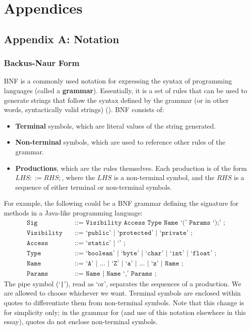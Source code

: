 \section{Appendices}

\subsection{Appendix A: Notation}
\label{sec:AppA}

\subsubsection*{Backus-Naur Form}
BNF is a commonly used notation for expressing the syntax of programming languages (called a \textbf{grammar}). Essentially, it is a set of rules that can be used to generate strings that follow the syntax defined by the grammar (or in other words, syntactically valid strings) (\cite{nystrom}). BNF consists of:
\begin{itemize}
\item \textbf{Terminal} symbols, which are literal values of the string generated.
\item \textbf{Non-terminal} symbols, which are used to reference other rules of the grammar.
\item \textbf{Productions}, which are the rules themselves. Each production is of the form $LHS ::= RHS;$, where the $LHS$ is a non-terminal symbol, and the $RHS$ is a sequence of either terminal or non-terminal symbols.
\end{itemize}

For example, the following could be a BNF grammar defining the signature for methods in a Java-like programming language:
{\small \begin{align*}
\texttt{Sig}        \quad&\texttt{::= Visibility Access Type Name `(' Params `);' ;}   \\
\texttt{Visibility} \quad&\texttt{::= `public' | `protected' | `private' ;}            \\
\texttt{Access}     \quad&\texttt{::= `static' | `' ;}                                 \\
\texttt{Type}       \quad&\texttt{::= `boolean' | `byte' | `char' | `int' | `float' ;} \\
\texttt{Name}       \quad&\texttt{::= `A' | ... | `Z' | `a' | ... | `z' | Name ;}      \\
\texttt{Params}     \quad&\texttt{::= Name | Name `,' Params ;}
\end{align*}}
The pipe symbol (`\texttt{|}'), read as `or', separates the sequences of a production. We are allowed to choose whichever we want. Terminal symbols are enclosed within quotes to differentiate them from non-terminal symbols. Note that this change is for simplicity only; in the grammar for \lambdacalc{} (and use of this notation elsewhere in this essay), quotes do not enclose non-terminal symbols.


